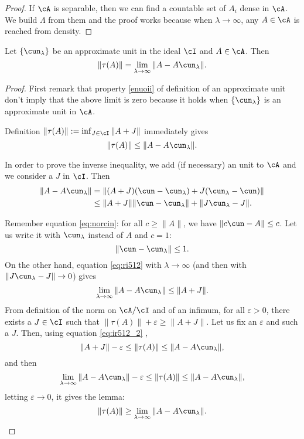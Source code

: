 \begin{proof}
If $\cA$ is separable, then we can find a countable set of $A_i$ dense in $\cA$. We build $\Lambda$ from them and the proof works because when $\lambda\to\infty$, any $A\in\cA$ is reached from density.

\end{proof}


\begin{lemma} \label{lem:taulimA}
Let $\{ \cun_{\lambda} \}$ be an approximate unit in the ideal $\cI$ and $A\in\cA$. Then
\begin{equation}
\| \tau(A)\|=\lim_{\lambda\to\infty}\| A-A\cun_{\lambda} \|.
\end{equation}

\end{lemma}


\begin{proof}
First remark that property \ref{enuoii} of definition of an approximate unit don't imply that the above limit is zero because it holds when $\{ \cun_{\lambda} \}$ is an approximate unit in $\cA$. 

Definition $\| \tau(A) \|:=\inf_{J\in\cI}\| A+J \|$ immediately gives
\begin{equation} \label{eq:ir512_2}
  \|\tau(A)\|\leq \| A-A\cun_{\lambda} \|.
\end{equation}

In order to prove the inverse inequality, we add (if necessary) an unit to $\cA$ and we consider a $J$ in $\cI$. Then
\begin{equation} \label{eq:ri512}
\begin{split}
  \| A-A\cun_{\lambda} \|&=\| (A+J)(\cun-\cun_{\lambda})+J(\cun_{\lambda}-\cun) \|\\
                         &\leq \| A+J \|\| \cun-\cun_{\lambda} \|+\| J\cun_{\lambda}-J \|.
\end{split}
\end{equation}

Remember equation \eqref{eq:norcin}: for all $c\geq \| A \|$, we have $\| c\cun-A \|\leq c$. Let us write it  with $\cun_{\lambda}$ instead of $A$ and $c=1$:
\[ 
  \| \cun-\cun_{\lambda} \|\leq 1.
\]
On the other hand, equation \eqref{eq:ri512} with $\lambda\to\infty$ (and then with $\| J\cun_{\lambda}-J \|\to 0$) gives
\[ 
  \lim_{\lambda\to\infty}\| A-A\cun_{\lambda} \|\leq\| A+J \|.
\]
From definition of the norm on $\cA/\cI$ and of an infimum, for all $\varepsilon>0$, there exists a $J\in \cI$ such that $\| \tau(A) \|+\varepsilon\geq\| A+J \|$. Let us fix an $\varepsilon$ and such a $J$. Then, using equation \eqref{eq:ir512_2} , 
\[ 
  \| A+J \|-\varepsilon\leq\| \tau(A) \|\leq\| A-A\cun_{\lambda} \|,
\]
 and then
\[ 
  \lim_{\lambda\to\infty}\| A-A\cun_{\lambda} \|-\varepsilon \leq\| \tau(A) \|\leq\| A-A\cun_{\lambda} \|,
\]
letting $\varepsilon\to 0$, it gives the lemma:
\[ 
  \| \tau(A) \|\geq \lim_{\lambda\to\infty}\| A-A\cun_{\lambda} \|.
\]


\end{proof}

